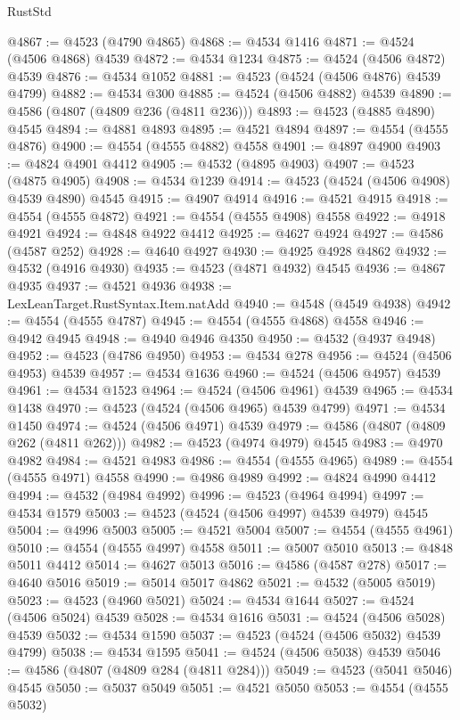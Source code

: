 \begin{lexlean}{RustStd}
\begin{coremodule}
@4867 := @4523 (@4790 @4865)
@4868 := @4534 @1416
@4871 := @4524 (@4506 @4868) @4539
@4872 := @4534 @1234
@4875 := @4524 (@4506 @4872) @4539
@4876 := @4534 @1052
@4881 := @4523 (@4524 (@4506 @4876) @4539 @4799)
@4882 := @4534 @300
@4885 := @4524 (@4506 @4882) @4539
@4890 := @4586 (@4807 (@4809 @236 (@4811 @236)))
@4893 := @4523 (@4885 @4890) @4545
@4894 := @4881 @4893
@4895 := @4521 @4894
@4897 := @4554 (@4555 @4876)
@4900 := @4554 (@4555 @4882) @4558
@4901 := @4897 @4900
@4903 := @4824 @4901 @4412
@4905 := @4532 (@4895 @4903)
@4907 := @4523 (@4875 @4905)
@4908 := @4534 @1239
@4914 := @4523 (@4524 (@4506 @4908) @4539 @4890) @4545
@4915 := @4907 @4914
@4916 := @4521 @4915
@4918 := @4554 (@4555 @4872)
@4921 := @4554 (@4555 @4908) @4558
@4922 := @4918 @4921
@4924 := @4848 @4922 @4412
@4925 := @4627 @4924
@4927 := @4586 (@4587 @252)
@4928 := @4640 @4927
@4930 := @4925 @4928 @4862
@4932 := @4532 (@4916 @4930)
@4935 := @4523 (@4871 @4932) @4545
@4936 := @4867 @4935
@4937 := @4521 @4936
@4938 := LexLeanTarget.RustSyntax.Item.natAdd
@4940 := @4548 (@4549 @4938)
@4942 := @4554 (@4555 @4787)
@4945 := @4554 (@4555 @4868) @4558
@4946 := @4942 @4945
@4948 := @4940 @4946 @4350
@4950 := @4532 (@4937 @4948)
@4952 := @4523 (@4786 @4950)
@4953 := @4534 @278
@4956 := @4524 (@4506 @4953) @4539
@4957 := @4534 @1636
@4960 := @4524 (@4506 @4957) @4539
@4961 := @4534 @1523
@4964 := @4524 (@4506 @4961) @4539
@4965 := @4534 @1438
@4970 := @4523 (@4524 (@4506 @4965) @4539 @4799)
@4971 := @4534 @1450
@4974 := @4524 (@4506 @4971) @4539
@4979 := @4586 (@4807 (@4809 @262 (@4811 @262)))
@4982 := @4523 (@4974 @4979) @4545
@4983 := @4970 @4982
@4984 := @4521 @4983
@4986 := @4554 (@4555 @4965)
@4989 := @4554 (@4555 @4971) @4558
@4990 := @4986 @4989
@4992 := @4824 @4990 @4412
@4994 := @4532 (@4984 @4992)
@4996 := @4523 (@4964 @4994)
@4997 := @4534 @1579
@5003 := @4523 (@4524 (@4506 @4997) @4539 @4979) @4545
@5004 := @4996 @5003
@5005 := @4521 @5004
@5007 := @4554 (@4555 @4961)
@5010 := @4554 (@4555 @4997) @4558
@5011 := @5007 @5010
@5013 := @4848 @5011 @4412
@5014 := @4627 @5013
@5016 := @4586 (@4587 @278)
@5017 := @4640 @5016
@5019 := @5014 @5017 @4862
@5021 := @4532 (@5005 @5019)
@5023 := @4523 (@4960 @5021)
@5024 := @4534 @1644
@5027 := @4524 (@4506 @5024) @4539
@5028 := @4534 @1616
@5031 := @4524 (@4506 @5028) @4539
@5032 := @4534 @1590
@5037 := @4523 (@4524 (@4506 @5032) @4539 @4799)
@5038 := @4534 @1595
@5041 := @4524 (@4506 @5038) @4539
@5046 := @4586 (@4807 (@4809 @284 (@4811 @284)))
@5049 := @4523 (@5041 @5046) @4545
@5050 := @5037 @5049
@5051 := @4521 @5050
@5053 := @4554 (@4555 @5032)

\end{coremodule}
\end{lexlean}
